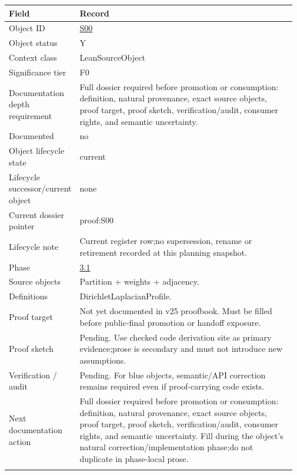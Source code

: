 \begin{longtable}{L{0.16\linewidth} L{0.81\linewidth}}
\hline
\textbf{Field} & \textbf{Record}\\
\hline
Object ID & \hyperlink{object-row-S00}{S00}\\
\hline\addlinespace[0.20em]
Object status & Y\\
\hline\addlinespace[0.20em]
Context class & LeanSourceObject\\
\hline\addlinespace[0.20em]
Significance tier & F0\\
\hline\addlinespace[0.20em]
Documentation depth requirement & Full dossier required before promotion or consumption: definition, natural provenance, exact source objects, proof target, proof sketch, verification/\allowbreak{}audit, consumer rights, and semantic uncertainty.\\
\hline\addlinespace[0.20em]
Documented & no\\
\hline\addlinespace[0.20em]
Object lifecycle state & current\\
\hline\addlinespace[0.20em]
Lifecycle successor/\allowbreak{}current object & none\\
\hline\addlinespace[0.20em]
Current dossier pointer & proof:S00\\
\hline\addlinespace[0.20em]
Lifecycle note & Current register row;\newline no supersession, rename or retirement recorded at this planning snapshot.\\
\hline\addlinespace[0.20em]
Phase & \hyperlink{phase-row-3-1}{3.1}\\
\hline\addlinespace[0.20em]
Source objects & Partition + weights + adjacency.\\
\hline\addlinespace[0.20em]
Definitions & DirichletLaplacianProfile.\\
\hline\addlinespace[0.20em]
Proof target & Not yet documented in v25 proofbook. Must be filled before public-final promotion or handoff exposure.\\
\hline\addlinespace[0.20em]
Proof sketch & Pending. Use checked code derivation site as primary evidence;\newline prose is secondary and must not introduce new assumptions.\\
\hline\addlinespace[0.20em]
Verification /\allowbreak{} audit & Pending. For blue objects, semantic/\allowbreak{}API correction remains required even if proof-carrying code exists.\\
\hline\addlinespace[0.20em]
Next documentation action & Full dossier required before promotion or consumption: definition, natural provenance, exact source objects, proof target, proof sketch, verification/\allowbreak{}audit, consumer rights, and semantic uncertainty. Fill during the object's natural correction/\allowbreak{}implementation phase;\newline do not duplicate in phase-local prose.\\
\hline\addlinespace[0.20em]
\end{longtable}
